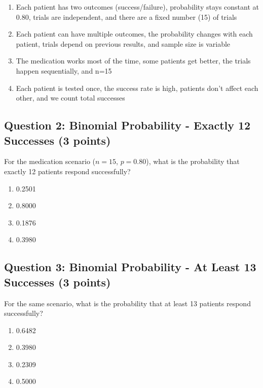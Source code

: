 \documentclass[11pt]{article}
\begin{document}
\begin{enumerate}[label=\Alph*)]
\item Each patient has two outcomes (success/failure), probability stays constant at 0.80, trials are independent, and there are a fixed number (15) of trials
\item Each patient can have multiple outcomes, the probability changes with each patient, trials depend on previous results, and sample size is variable
\item The medication works most of the time, some patients get better, the trials happen sequentially, and n=15
\item Each patient is tested once, the success rate is high, patients don't affect each other, and we count total successes
\end{enumerate}

\vspace{0.5cm}

\subsection*{Question 2: Binomial Probability - Exactly 12 Successes (3 points)}

For the medication scenario ($n=15$, $p=0.80$), what is the probability that exactly 12 patients respond successfully?

\begin{enumerate}[label=\Alph*)]
\item 0.2501
\item 0.8000
\item 0.1876
\item 0.3980
\end{enumerate}

\vspace{0.5cm}

\subsection*{Question 3: Binomial Probability - At Least 13 Successes (3 points)}

For the same scenario, what is the probability that at least 13 patients respond successfully?

\begin{enumerate}[label=\Alph*)]
\item 0.6482
\item 0.3980
\item 0.2309
\item 0.5000
\end{enumerate}
\end{document}
